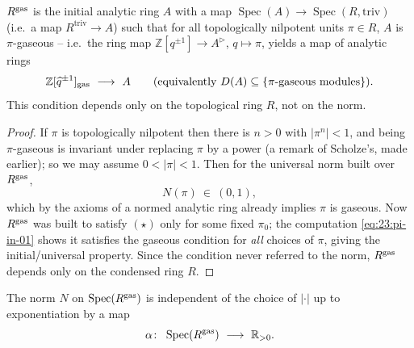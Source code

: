 \begin{proposition}
\label{prop:23:intrinsic}
$R^{\mathrm{gas}}$ is the initial analytic ring $A$ with a map
$\operatorname{Spec}(A)\to\operatorname{Spec}(R,\mathrm{triv})$ (i.e.\ a map
$R^{\mathrm{triv}}\to A$) such that for all topologically nilpotent units
$\pi\in R$, $A$ is $\pi$-gaseous -- i.e.\ the ring map
$\mathbb Z[q^{\pm1}]\to A^\triangleright$, $q\mapsto\pi$, yields a map of
analytic rings
\begin{equation*}
\mathbb Z[\widehat q^{\pm1}]_{\mathrm{gas}}\ \longrightarrow\ A
\qquad(\text{equivalently } D(A)\subseteq\{\pi\text{-gaseous modules}\}).
\end{equation*}
This condition depends only on the topological ring $R$, not on the norm.
\end{proposition}

\begin{proof}
If $\pi$ is topologically nilpotent then there is $n>0$ with
$\lvert\pi^n\rvert<1$, and being $\pi$-gaseous is invariant under replacing $\pi$
by a power (a remark of Scholze's, made earlier); so we may assume
$0<\lvert\pi\rvert<1$. Then for the universal norm built over $R^{\mathrm{gas}}$,
\begin{equation}
\label{eq:23:pi-in-01}
N(\pi)\ \in\ (0,1),
\end{equation}
which by the axioms of a normed analytic ring already implies $\pi$ is gaseous.
Now $R^{\mathrm{gas}}$ was built to satisfy $(\star)$ only for some fixed $\pi_0$; the
computation \eqref{eq:23:pi-in-01} shows it satisfies the gaseous condition for
\emph{all} choices of $\pi$, giving the initial/universal property. Since the
condition never referred to the norm, $R^{\mathrm{gas}}$ depends only on the condensed
ring $R$.
\end{proof}

\begin{proposition}
\label{prop:23:norm-rescaling}
The norm $N$ on $\operatorname{Spec}(R^{\mathrm{gas}})$ is independent of the choice of
$\lvert\cdot\rvert$ up to exponentiation by a map
\begin{equation*}
\alpha\colon\ \operatorname{Spec}(R^\gasx)\ \longrightarrow\ \mathbb R_{>0}.
\end{equation*}
\end{proposition}

